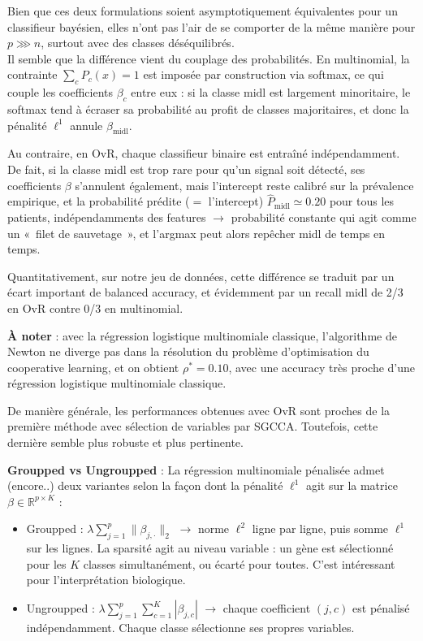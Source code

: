 \documentclass[a4paper,11pt]{paper}
\theoremstyle{plain}
\theoremstyle{definition}
\theoremstyle{remark}
\begin{document}
Bien que ces deux formulations soient asymptotiquement équivalentes pour un classifieur bayésien, elles n'ont pas l'air de se comporter de la même manière pour $p \ggg n$, surtout avec des classes déséquilibrés. \\
Il semble que la différence vient du couplage des probabilités. En multinomial, la contrainte $\displaystyle \sum_c P_c(x) = 1$ est imposée par construction via softmax, ce qui couple les coefficients $\beta_c$ entre eux : si la classe $\text{midl}$ est largement minoritaire, le softmax tend à écraser sa probabilité au profit de classes majoritaires, et donc la pénalité $\ell^1$ annule $\beta_{\text{midl}}$.

Au contraire, en OvR, chaque classifieur binaire est entraîné indépendamment. De fait, si la classe midl est trop rare pour qu'un signal soit détecté, ses coefficients $\beta$ s'annulent également, mais l'intercept reste calibré sur la prévalence empirique, et la probabilité prédite ($=$ l'intercept) $\hat P_{\text{midl}} \simeq 0.20$ pour tous les patients, indépendamments des features $\longrightarrow$ probabilité constante qui agit comme un «~filet de sauvetage~», et l'argmax peut alors repêcher midl de temps en temps.

Quantitativement, sur notre jeu de données, cette différence se traduit par un écart important de balanced accuracy, et évidemment par un recall midl de 2/3 en OvR contre 0/3 en multinomial.

\textbf{À noter} : avec la régression logistique multinomiale classique, l'algorithme de Newton ne diverge pas dans la résolution du problème d'optimisation du cooperative learning, et on obtient $\rho^* = 0.10$, avec une accuracy très proche d'une régression logistique multinomiale classique.

\bigskip

De manière générale, les performances obtenues avec OvR sont proches de la première méthode avec sélection de variables par SGCCA. Toutefois, cette dernière semble plus robuste et plus pertinente.

\bigskip

\textbf{Groupped vs Ungroupped} : La régression multinomiale pénalisée admet (encore..) deux variantes selon la façon dont la pénalité $\ell^1$ agit sur la matrice $\beta \in \mathbb{R}^{p \times K}$ :
\begin{itemize}
    \item Groupped : $\lambda \sum_{j=1}^{p} \|\beta_{j,\cdot}\|_2$ $\longrightarrow$ norme $\ell^2$ ligne par ligne, puis somme $\ell^1$ sur les lignes. La sparsité agit au niveau variable : un gène est sélectionné pour les $K$ classes simultanément, ou écarté pour toutes. C'est intéressant pour l'interprétation biologique.
    \item Ungroupped : $\lambda \sum_{j=1}^{p} \sum_{c=1}^{K} |\beta_{j,c}|$ $\longrightarrow$ chaque coefficient $(j,c)$ est pénalisé indépendamment. Chaque classe sélectionne ses propres variables.
\end{itemize}
\end{document}
